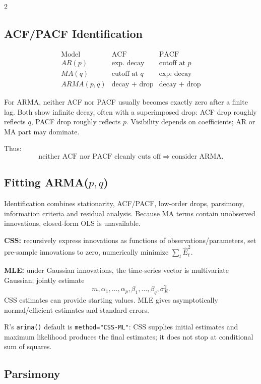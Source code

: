 \documentclass[9pt,a4paper]{extarticle}
\newcommand{\key}[1]{\textbf{#1}}
\begin{document}
\begin{multicols}{2}
\subsection{ACF/PACF Identification}

\[
\boxed{
\begin{array}{c|c|c}
\text{Model} & \text{ACF} & \text{PACF}\\ \hline
AR(p) & \text{exp. decay} & \text{cutoff at }p\\
MA(q) & \text{cutoff at }q & \text{exp. decay}\\
ARMA(p,q) & \text{decay + drop} & \text{decay + drop}
\end{array}}
\]

For ARMA, neither ACF nor PACF usually becomes exactly zero after a finite lag. Both show infinite decay, often with a superimposed drop: ACF drop roughly reflects \(q\), PACF drop roughly reflects \(p\). Visibility depends on coefficients; AR or MA part may dominate.

Thus:
\[
\boxed{\text{neither ACF nor PACF cleanly cuts off}\Rightarrow\text{consider ARMA}.}
\]

\subsection{Fitting ARMA($p,q$)}

Identification combines stationarity, ACF/PACF, low-order drops, parsimony, information criteria and residual analysis. Because MA terms contain unobserved innovations, closed-form OLS is unavailable.

\key{CSS:} recursively express innovations as functions of observations/parameters, set pre-sample innovations to zero, numerically minimize \(\sum_t\widehat E_t^2\).

\key{MLE:} under Gaussian innovations, the time-series vector is multivariate Gaussian; jointly estimate
\[
m,\alpha_1,\ldots,\alpha_p,\beta_1,\ldots,\beta_q,\sigma_E^2.
\]
CSS estimates can provide starting values. MLE gives asymptotically normal/efficient estimates and standard errors.

R's \texttt{arima()} default is \texttt{method="CSS-ML"}: CSS supplies initial estimates and maximum likelihood produces the final estimates; it does not stop at conditional sum of squares.

\subsection{Parsimony}


\end{multicols}
\end{document}
